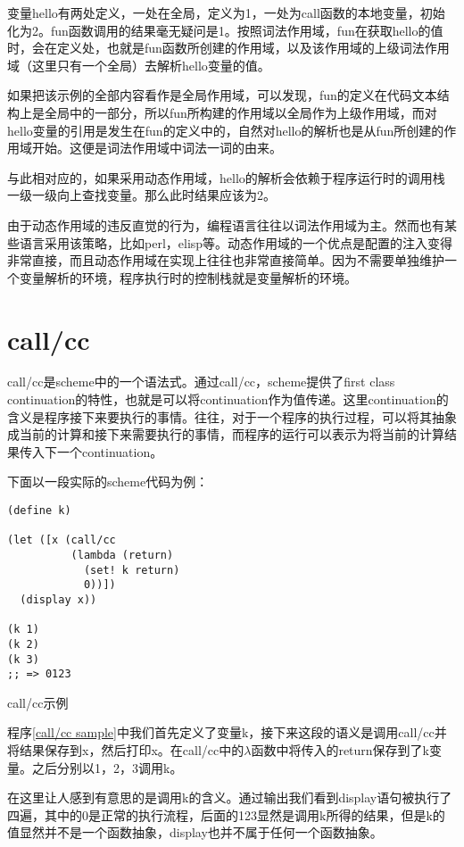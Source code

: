 变量hello有两处定义，一处在全局，定义为1，一处为call函数的本地变量，初始化为2。fun函数调用的结果毫无疑问是1。按照词法作用域，fun在获取hello的值时，会在定义处，也就是fun函数所创建的作用域，以及该作用域的上级词法作用域（这里只有一个全局）去解析hello变量的值。

如果把该示例的全部内容看作是全局作用域，可以发现，fun的定义在代码文本结构上是全局中的一部分，所以fun所构建的作用域以全局作为上级作用域，而对hello变量的引用是发生在fun的定义中的，自然对hello的解析也是从fun所创建的作用域开始。这便是词法作用域中词法一词的由来。

与此相对应的，如果采用动态作用域，hello的解析会依赖于程序运行时的调用栈一级一级向上查找变量。那么此时结果应该为2。

由于动态作用域的违反直觉的行为，编程语言往往以词法作用域为主。然而也有某些语言采用该策略，比如perl，elisp等。动态作用域的一个优点是配置的注入变得非常直接，而且动态作用域在实现上往往也非常直接简单。因为不需要单独维护一个变量解析的环境，程序执行时的控制栈就是变量解析的环境。

\section{call/cc}

call/cc是scheme中的一个语法式。通过call/cc，scheme提供了first class continuation的特性，也就是可以将continuation作为值传递。这里continuation的含义是程序接下来要执行的事情。往往，对于一个程序的执行过程，可以将其抽象成当前的计算和接下来需要执行的事情，而程序的运行可以表示为将当前的计算结果传入下一个continuation。

下面以一段实际的scheme代码为例：

\begin{code}
\begin{verbatim}
(define k)

(let ([x (call/cc
          (lambda (return)
            (set! k return)
            0))])
  (display x))

(k 1)
(k 2)
(k 3)
;; => 0123
\end{verbatim}
\caption{call/cc示例}
\label{call/cc sample}
\end{code}

程序\ref{call/cc sample}中我们首先定义了变量k，接下来这段的语义是调用call/cc并将结果保存到x，然后打印x。在call/cc中的$\lambda$函数中将传入的return保存到了k变量。之后分别以1，2，3调用k。

在这里让人感到有意思的是调用k的含义。通过输出我们看到display语句被执行了四遍，其中的0是正常的执行流程，后面的123显然是调用k所得的结果，但是k的值显然并不是一个函数抽象，display也并不属于任何一个函数抽象。

